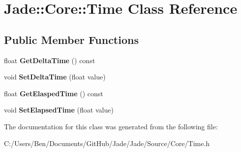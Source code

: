 \hypertarget{class_jade_1_1_core_1_1_time}{}\section{Jade\+:\+:Core\+:\+:Time Class Reference}
\label{class_jade_1_1_core_1_1_time}
\subsection*{Public Member Functions}
\begin{DoxyCompactItemize}
\item 
\hypertarget{class_jade_1_1_core_1_1_time_a9d2268af76e7d287804e4ecbad85926d}{}float {\bfseries Get\+Delta\+Time} () const \label{class_jade_1_1_core_1_1_time_a9d2268af76e7d287804e4ecbad85926d}

\item 
\hypertarget{class_jade_1_1_core_1_1_time_aba25dfc07f7088e3fe330f3bd09a912d}{}void {\bfseries Set\+Delta\+Time} (float value)\label{class_jade_1_1_core_1_1_time_aba25dfc07f7088e3fe330f3bd09a912d}

\item 
\hypertarget{class_jade_1_1_core_1_1_time_a92a3fc0c7bb1238cf3353fb32e7cb5d8}{}float {\bfseries Get\+Elasped\+Time} () const \label{class_jade_1_1_core_1_1_time_a92a3fc0c7bb1238cf3353fb32e7cb5d8}

\item 
\hypertarget{class_jade_1_1_core_1_1_time_ab7af570450dd7c8a9c613c49a22c3aa2}{}void {\bfseries Set\+Elapsed\+Time} (float value)\label{class_jade_1_1_core_1_1_time_ab7af570450dd7c8a9c613c49a22c3aa2}

\end{DoxyCompactItemize}


The documentation for this class was generated from the following file\+:\begin{DoxyCompactItemize}
\item 
C\+:/\+Users/\+Ben/\+Documents/\+Git\+Hub/\+Jade/\+Jade/\+Source/\+Core/Time.\+h\end{DoxyCompactItemize}
